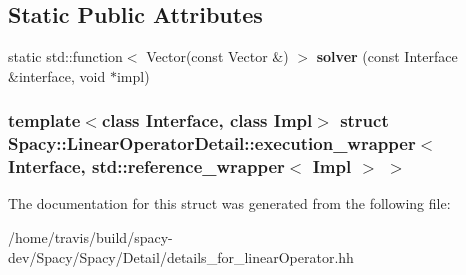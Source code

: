 \subsection*{\-Static \-Public \-Attributes}
\begin{DoxyCompactItemize}
\item 
\hypertarget{structSpacy_1_1LinearOperatorDetail_1_1execution__wrapper_3_01Interface_00_01std_1_1reference__wrapper_3_01Impl_01_4_01_4_a71b9bd002dc10fb79ebb967a95c802c9}{static std\-::function$<$ \-Vector(const \*
\-Vector \&) $>$ {\bfseries solver} (const \-Interface \&interface, void $\ast$impl)}\label{structSpacy_1_1LinearOperatorDetail_1_1execution__wrapper_3_01Interface_00_01std_1_1reference__wrapper_3_01Impl_01_4_01_4_a71b9bd002dc10fb79ebb967a95c802c9}

\end{DoxyCompactItemize}
\subsubsection*{template$<$class Interface, class Impl$>$ struct Spacy\-::\-Linear\-Operator\-Detail\-::execution\-\_\-wrapper$<$ Interface, std\-::reference\-\_\-wrapper$<$ Impl $>$ $>$}



\-The documentation for this struct was generated from the following file\-:\begin{DoxyCompactItemize}
\item 
/home/travis/build/spacy-\/dev/\-Spacy/\-Spacy/\-Detail/details\-\_\-for\-\_\-linear\-Operator.\-hh\end{DoxyCompactItemize}
